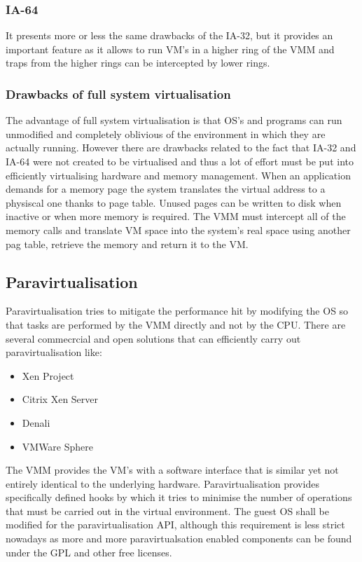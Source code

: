 \documentclass[paper=a4, fontsize=11pt]{report} %
\numberwithin{equation}{section} %
\numberwithin{figure}{section} %
\numberwithin{table}{section} %
\begin{document}
\subsubsection{IA-64} It presents more or less the same drawbacks of the IA-32, but
it provides an important feature as it allows to run VM's in a higher ring of 
the VMM and traps from the higher rings can be intercepted by lower rings.
\subsubsection{Drawbacks of full system virtualisation}
The advantage of full system virtualisation is that OS's and programs can run 
unmodified and completely oblivious of the environment in which they are 
actually running. However there are drawbacks related to the fact that IA-32 
and IA-64 were not created to be virtualised and thus a lot of effort must be 
put into efficiently virtualising hardware and memory management. When an 
application demands for a memory page the system translates the virtual address 
to a physiscal one thanks to page table. Unused pages can be written to disk 
when inactive or when more memory is required. The VMM must intercept all of 
the memory calls and translate VM space into the system's real space using 
another pag table, retrieve the memory and return it to the VM.
\subsection{Paravirtualisation} Paravirtualisation tries to mitigate the
performance hit by modifying the OS so that tasks are performed by the VMM 
directly and not by the CPU. There are several commecrcial and open solutions 
that can efficiently carry out paravirtualisation like:
\begin{itemize}
	\item Xen Project
	\item Citrix Xen Server
	\item Denali
	\item VMWare Sphere
\end{itemize}
The VMM provides the VM's with a software interface that is similar yet not
entirely identical to the underlying hardware. Paravirtualisation provides 
specifically defined hooks by which it tries to minimise the number of 
operations that must be carried out in the virtual environment. The guest OS 
shall be modified for the paravirtualisation API, although this requirement is 
less strict nowadays as more and more paravirtualsation enabled components can 
be found under the GPL and other free licenses.
\end{document}
